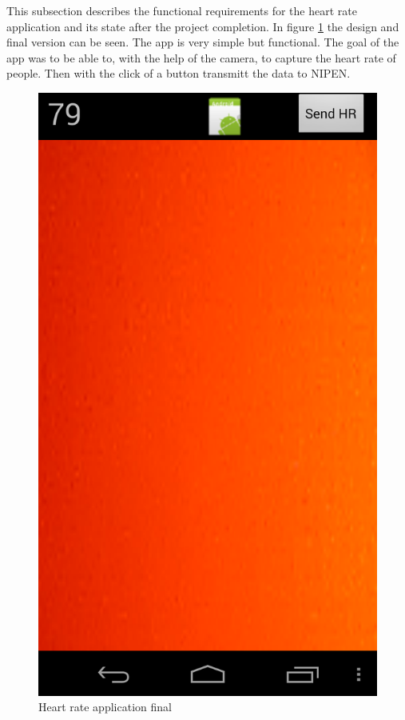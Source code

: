 
This subsection describes the functional requirements for the heart rate application and its state after the project completion.
In figure \ref{figure:appfinal} the design and final version can be seen.
The app is very simple but functional. 
The goal of the app was to be able to, with the help of the camera, to capture the heart rate of people.
Then with the click of a button transmitt the data to NIPEN.


\begin{figure}[H]
\centering
\includegraphics[scale=0.20]{../Figures/appfinal.png}
\caption{Heart rate application final}
\label{figure:appfinal}
\end{figure}


